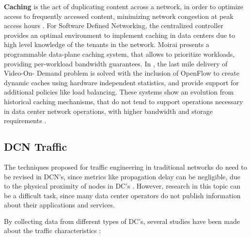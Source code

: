 \par \textbf{Caching} is the act of duplicating content across a network, in order to optimize access to frequently accessed content, minimizing network congestion
at peak access hours \cite{maddah-ali_fundamental_2014}. For Software Defined Networking, the centralized controller provides an optimal environment to implement 
caching in data centers due to high level knowledge of the tenants in the network. Moirai \cite{stefanovici_software-defined_2015} presents a programmable 
data-plane caching system, that allows to prioritize workloads, providing per-workload bandwidth guarantees. In \cite{georgopoulos_cache_2014}, the last mile
delivery of Video-On- Demand problem is solved with the inclusion of OpenFlow to create dynamic caches using hardware independent statistics, and provide support
for additional policies like load balancing. These systems show an evolution from historical caching mechanisms, that do not tend to support operations necessary in
data center network operations, with higher bandwidth and storage requirements \cite{stefanovici_software-defined_2015}.

\subsection {DCN Traffic}

\par The techniques proposed for traffic engineering in traditional networks do need to be revised in DCN's, since metrics like propagation delay can be
negligible, due to the physical proximity of nodes in DC's \cite{bari_data_2013}. However, research in this topic can be a difficult task,
since many data center operators do not publish information about their applications and services.

\par By collecting data from different types of DC's, several studies have been made about the traffic characteristics 
\cite{benson_network_2010, benson_understanding_2009, roy_inside_2015}:

